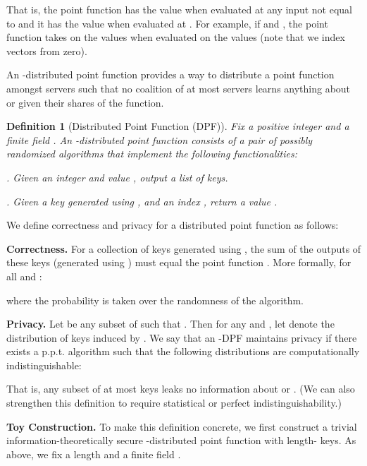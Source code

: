 \documentclass[10pt,twocolumn]{article}
\newtheorem{defn}{Definition}
\newcommand{\nicepara}[1]{\medskip\noindent\textbf{#1.}}
\begin{document}
That is, the point function  has the value  when evaluated at any 
input not equal to  and it has the value  when evaluated at .
For example, if  and , the point function 
 takes on the values  when evaluated
on the values  (note that we index vectors from zero).

An -distributed point function provides a way to 
distribute a point function  amongst  servers such that
no coalition of at most  servers learns anything about  or 
given their  shares of the function.

\begin{defn}[Distributed Point Function (DPF)]
Fix a positive integer  and a finite field .
An {\em -distributed point function} consists of a pair
of possibly randomized algorithms that implement the following functionalities:
\begin{compactitem}

\item
  .
Given an integer  and value , 
output a list of  keys.

\item
.
Given a key  generated using , and 
an index , return a value .
\end{compactitem}
\end{defn}

We define correctness and privacy for 
a distributed point function as follows:
\begin{compactitem}

\item
{\bf Correctness.}
For a collection of  keys generated using ,
the sum of the outputs of these keys (generated using )
must equal the point function .
More formally, for all  and :

where the probability is taken over the randomness of the  algorithm.

\item
{\bf Privacy.}
Let  be any subset of  
such that .
Then for any  and ,
let  denote the distribution of
keys  induced by 
.
We say that an -DPF maintains privacy if
there exists a p.p.t. algorithm  such that
the following distributions are computationally
indistinguishable:

That is, any subset of at most
 keys leaks no information about  or .
(We can also strengthen this definition to require statistical
or perfect indistinguishability.)
\end{compactitem}

\medskip

\nicepara{Toy Construction}
To make this definition concrete,
we first construct a trivial information-theoretically secure 
\mbox{}-distributed point function with length- keys.
As above, we fix a length  and a finite field .
\end{document}
